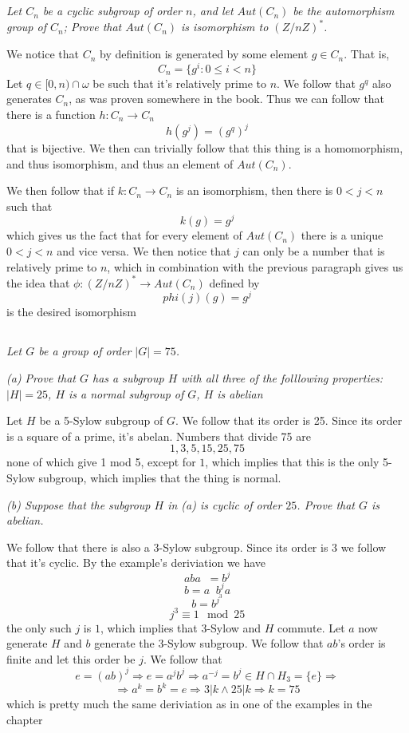 \documentclass[11pt,oneside,titlepage]{book}
\DeclareMathOperator \inv {^{-1}}
\DeclareMathOperator \ra {\Rightarrow}
\newcommand{\set}[1]{\{ #1 \}}
\begin{document}
\subsection{}

\textit{Let $C_n$ be a cyclic subgroup of order $n$, and let
  $Aut(C_n)$ be the automorphism group of $C_n$; Prove that
  $Aut(C_n)$ is isomorphism to $(Z/nZ)^*$.}

We notice that $C_n$ by definition is generated by some element
$g \in C_n$. That is,
$$C_n = \set{g^i: 0 \leq i < n}$$
Let $q \in [0, n) \cap \omega$ be such that it's relatively prime to
$n$.  We follow that $g^q$ also generates $C_n$, as was proven
somewhere in the book. Thus we can follow that there is a function $h:
C_n \to C_n$
$$h(g^j) = (g^q)^j$$
that is bijective. We then can trivially follow that this thing is a
homomorphism, and thus isomorphism, and thus an element of $Aut(C_n)$.

We then follow that if $k: C_n \to C_n$ is an isomorphism, then there is
$0 < j < n$ such that
$$k(g) = g^j$$
which gives us the fact that for every element of $Aut(C_n)$ there is
a unique $0 < j < n$ and vice versa. We then notice that $j$ can only
be a number that is relatively prime to $n$, which in combination with
the previous paragraph gives us the idea that $\phi: (Z/nZ)^* \to Aut(C_n)$
defined by
$$phi(j)(g) = g^j$$
is the desired isomorphism


\subsection{}

\textit{Let $G$ be a group of order $|G| = 75$.}

\textit{(a) Prove that $G$ has a subgroup $H$ with all three of the
  folllowing properties: $|H| = 25$, $H$ is a normal subgroup of $G$,
  $H$ is abelian}

Let $H$ be a 5-Sylow subgroup of $G$. We follow that its order is
25. Since its order is a square of a prime, it's abelan. Numbers that
divide 75 are
$$1, 3, 5, 15, 25, 75$$
none of which give 1 mod 5, except for $1$, which implies that this is
the only 5-Sylow subgroup, which implies that the thing is normal.

\textit{(b) Suppose that the subgroup $H$ in (a) is cyclic of order
  $25$.  Prove that $G$ is abelian.}

We follow that there is also a 3-Sylow subgroup. Since its order is
$3$ we follow that it's cyclic. By the example's deriviation we have 
$$aba\inv = b^j$$
$$b = a\inv b^j a$$
$$b = b^{j^3}$$
$$j^3 \equiv 1 \mod 25$$
the only such $j$ is $1$, which implies that 3-Sylow and $H$ commute.
Let $a$ now generate $H$ and $b$ generate the 3-Sylow subgroup. We
follow that $ab$'s order is finite and let this order be $j$. We
follow that
$$e = (ab)^j \ra e = a^j b^j \ra a^{-j} = b^j \in H \cap H_3
= \set{e} \ra$$
$$\ra a^k = b^k = e \ra 3 | k \land 25 | k \ra k = 75$$
which is pretty much the same deriviation as in one of the examples in
the chapter
\end{document}
